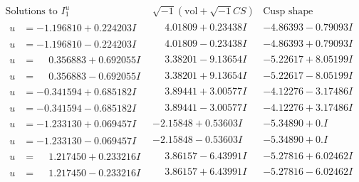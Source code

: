 \documentclass[1p]{elsarticle_modified}
\theoremstyle{definition}
\newcommand{\I}{\sqrt{-1}}
\begin{document}
$$\begin{array}{c|c|c}  
\text{Solutions to }I^u_{1}& \I (\text{vol} + \sqrt{-1}CS) & \text{Cusp shape}\\
 \hline 
\begin{aligned}
u &= -1.196810 + 0.224203 I\end{aligned}
 & \phantom{-}4.01809 + 0.23438 I & -4.86393 - 0.79093 I \\ \hline\begin{aligned}
u &= -1.196810 - 0.224203 I\end{aligned}
 & \phantom{-}4.01809 - 0.23438 I & -4.86393 + 0.79093 I \\ \hline\begin{aligned}
u &= \phantom{-}0.356883 + 0.692055 I\end{aligned}
 & \phantom{-}3.38201 - 9.13654 I & -5.22617 + 8.05199 I \\ \hline\begin{aligned}
u &= \phantom{-}0.356883 - 0.692055 I\end{aligned}
 & \phantom{-}3.38201 + 9.13654 I & -5.22617 - 8.05199 I \\ \hline\begin{aligned}
u &= -0.341594 + 0.685182 I\end{aligned}
 & \phantom{-}3.89441 + 3.00577 I & -4.12276 - 3.17486 I \\ \hline\begin{aligned}
u &= -0.341594 - 0.685182 I\end{aligned}
 & \phantom{-}3.89441 - 3.00577 I & -4.12276 + 3.17486 I \\ \hline\begin{aligned}
u &= -1.233130 + 0.069457 I\end{aligned}
 & -2.15848 + 0.53603 I & -5.34890 + 0. I\phantom{ +0.000000I} \\ \hline\begin{aligned}
u &= -1.233130 - 0.069457 I\end{aligned}
 & -2.15848 - 0.53603 I & -5.34890 + 0. I\phantom{ +0.000000I} \\ \hline\begin{aligned}
u &= \phantom{-}1.217450 + 0.233216 I\end{aligned}
 & \phantom{-}3.86157 - 6.43991 I & -5.27816 + 6.02462 I \\ \hline\begin{aligned}
u &= \phantom{-}1.217450 - 0.233216 I\end{aligned}
 & \phantom{-}3.86157 + 6.43991 I & -5.27816 - 6.02462 I \\ \hline\begin{aligned}

\end{aligned}
\end{array}$$
\end{document}
